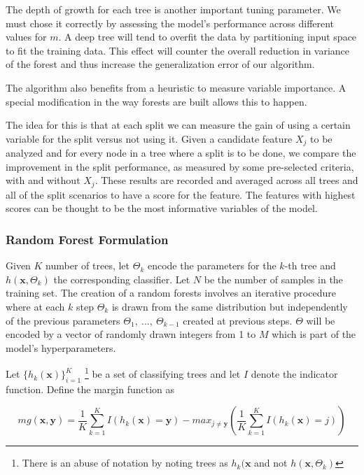 The depth of growth for each tree is another important tuning parameter. We must chose it correctly by assessing the model's performance across different values for $m$.  A deep tree will tend to overfit the data by partitioning input space to fit the training data. This effect will counter the overall reduction in variance of the forest and thus increase the generalization error of our algorithm.


The algorithm also benefits from a heuristic to measure variable importance.
A special modification in the way forests are built allows this to happen.

The idea for this is that at each split we can measure the gain of using a certain variable for the split versus not using it. Given a candidate feature $X_j$ to be analyzed and for every node in a tree where a split is to be done, we compare the improvement in the split performance, as measured by some pre-selected criteria, with and without $X_j$. These results are recorded and averaged across all trees and all of the split scenarios to have a score for the feature. The features with highest scores can be thought to be the most informative variables of the model.



\subsubsection{Random Forest Formulation}
Given $K$ number of trees, let $\Theta_k$ encode the parameters for the $k$-th tree and $h(\textbf{x},\Theta_k)$ the corresponding classifier. Let $N$ be the number of samples in the training set. The creation of a random forests involves an iterative procedure where at each $k$ step $\Theta_k$ is drawn from the same distribution but independently of the previous parameters $\Theta_1, \ ..., \ \Theta_{k-1}$ created at previous steps. $\Theta$ will be encoded by a vector of randomly drawn integers from 1 to $M$ which is part of the model's hyperparameters.


Let $\{h_k(\textbf{x})\}_{i=1}^K$  \footnote{There is an abuse of notation by noting trees as $h_k(\textbf{x}$ and not $h(\textbf{x}, \Theta_k)$ } be a set of classifying trees and let $I$ denote the indicator function.  Define the margin function as

$$mg(\textbf{x},\textbf{y}) =  \frac{1}{K}   \sum_{k=1}^K I(h_k(\textbf{x}) = \textbf{y})
- max_{j\neq \textbf{y}}\left(\frac{1}{K} \sum_{k=1}^K I(h_k(\textbf{x}) = j) \right) $$ \label{eq:rf-marginFun}

